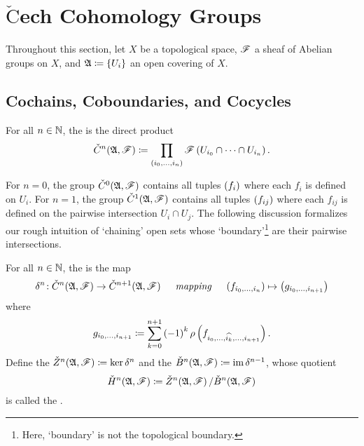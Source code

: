 \documentclass[../Moduli_Spaces_of_Riemann_Surfaces.tex]{subfiles}
\begin{document}
    \section{$\check{\textrm{C}}$ech Cohomology Groups}
    Throughout this section, let $X$ be a topological space, $\mathscr{F}$ a sheaf of Abelian groups on $X$, and $\mathfrak{A}\coloneqq\left\{U_i\right\}$ an open covering of $X$.
    \subsection{Cochains, Coboundaries, and Cocycles}
    \begin{definition}
        For all $n\in\mathbb{N}$, the  is the direct product
        \begin{equation*}
            \check{C}^n\!\left(\mathfrak{A},\mathscr{F}\right)\coloneqq\prod_{\left(i_0,\dots,i_n\right)}\mathscr{F}\left(U_{i_0}\cap\cdots\cap U_{i_n}\right).
        \end{equation*}
    \end{definition}
    \begin{remark}
        For $n=0$, the group $\check{C}^0\!\left(\mathfrak{A},\mathscr{F}\right)$ contains all tuples $\left(f_i\right)$ where each $f_i$ is defined on $U_i$. For $n=1$, the group $\check{C}^1\!\left(\mathfrak{A},\mathscr{F}\right)$ contains all tuples $\left(f_{ij}\right)$ where each $f_{ij}$ is defined on the pairwise intersection $U_i\cap U_j$. The following discussion formalizes our rough intuition of `chaining' open sets whose `boundary'\footnote{Here, `boundary' is not the topological boundary.} are their pairwise intersections.\exqed
    \end{remark}
    \begin{definition}
        For all $n\in\mathbb{N}$, the  is the map
        \begin{equation*}
            \delta^n\!:\check{C}^n\!\l(\mf{A},\ms{F}\r)\to\check{C}^{n+1}\!\l(\mf{A},\ms{F}\r)\ \ \ \ \textrm{\it{mapping}}\ \ \ \ \l(f_{i_0,\dots,i_n}\r)\mapsto\l(g_{i_0,\dots,i_{n+1}}\r)
        \end{equation*}
        where
        \begin{equation*}
            g_{i_0,\dots,i_{n+1}}\coloneqq\sum_{k=0}^{n+1}\left(-1\right)^k\rho\left(f_{i_0,\dots,\widehat{i_k},\dots,i_{n+1}}\right).
        \end{equation*}
        Define the  $\check{Z}^n\!\left(\mathfrak{A},\mathscr{F}\right)\coloneqq\ker\delta^n$ and the  $\check{B}^n\!\left(\mathfrak{A},\mathscr{F}\right)\coloneqq\operatorname{im}\delta^{n-1}$, whose quotient
        \begin{equation*}
            \check{H}^n\!\left(\mathfrak{A},\mathscr{F}\right)\coloneqq\check{Z}^n\!\left(\mathfrak{A},\mathscr{F}\right)/\check{B}^n\!\left(\mathfrak{A},\mathscr{F}\right)
        \end{equation*}
        is called the .
    \end{definition}
\end{document}
